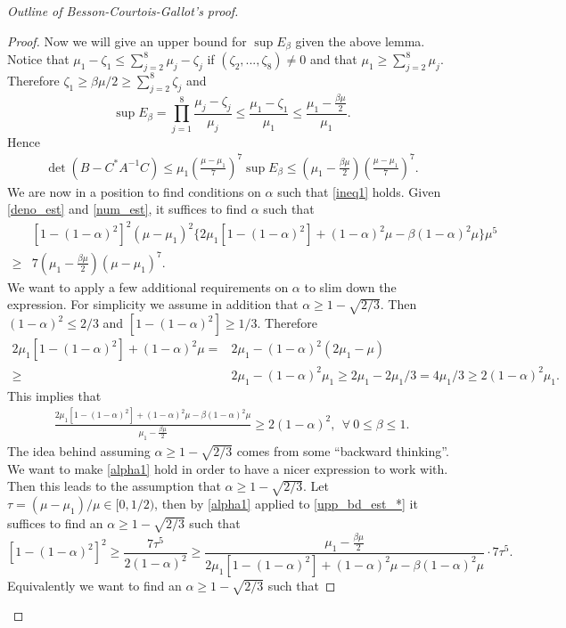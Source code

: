 \documentclass{article}
\theoremstyle{definition}
\begin{document}
\begin{proof}[Outline of Besson-Courtois-Gallot's proof]
\begin{proof}
Now we will give an upper bound for $\sup E_\beta$ given the above lemma. Notice that $\mu_1-\zeta_1\leq\sum_{j=2}^8\mu_j-\zeta_j$ if $(\zeta_2,...,\zeta_8)\neq 0$ and that $\mu_1\geq\sum_{j=2}^8\mu_j$. Therefore $\zeta_1\geq\beta\mu/2\geq\sum_{j=2}^8\zeta_j$ and
$$\sup E_\beta=\prod_{j=1}^8\frac{\mu_j-\zeta_j}{\mu_j}\leq\frac{\mu_1-\zeta_1}{\mu_1}\leq\frac{\mu_1-\frac{\beta\mu}{2}}{\mu_1}.$$
Hence
\begin{align}\label{num_est}
\det(B-C^*A^{-1}C)\leq \mu_1\left(\frac{\mu-\mu_1}{7}\right)^7\sup E_\beta\leq\left(\mu_1-\frac{\beta\mu}{2}\right)\left(\frac{\mu-\mu_1}{7}\right)^7.
\end{align}
We are now in a position to find conditions on $\alpha$ such that \eqref{ineq1} holds. Given \eqref{deno_est} and \eqref{num_est}, it suffices to find $\alpha$ such that
\begin{align}\label{upp_bd_est_*}
&[1-(1-\alpha)^2]^2(\mu-\mu_1)^2\{2\mu_1[1-(1-\alpha)^2]+(1-\alpha)^2\mu-\beta(1-\alpha)^2\mu\}\mu^5\nonumber \\
\geq&7\left(\mu_1-\frac{\beta\mu}{2}\right)(\mu-\mu_1)^7.
\end{align}
We want to apply a few additional requirements on $\alpha$ to slim down the expression. For simplicity we assume in addition that $\alpha\geq1-\sqrt{2/3}$. Then $(1-\alpha)^2\leq 2/3$ and $[1-(1-\alpha)^2]\geq 1/3$. Therefore
\begin{align*}
2\mu_1[1-(1-\alpha)^2]+(1-\alpha)^2\mu=&2\mu_1-(1-\alpha)^2(2\mu_1-\mu) \\
\geq&2\mu_1-(1-\alpha)^2\mu_1\geq2\mu_1-2\mu_1/3=4\mu_1/3\geq 2(1-\alpha)^2\mu_1.
\end{align*}
This implies that
\begin{align}\label{alpha1}
\frac{2\mu_1[1-(1-\alpha)^2]+(1-\alpha)^2\mu-\beta(1-\alpha)^2\mu}{\mu_1-\frac{\beta\mu}{2}}\geq 2(1-\alpha)^2,~~\forall~0\leq\beta\leq 1.
\end{align}
The idea behind assuming $\alpha\geq1-\sqrt{2/3}$ comes from some ``backward thinking''. We want to make \eqref{alpha1} hold in order to have a nicer expression to work with. Then this leads to the assumption that $\alpha\geq1-\sqrt{2/3}$. Let $\tau=(\mu-\mu_1)/\mu\in[0,1/2)$, then by \eqref{alpha1} applied to \eqref{upp_bd_est_*} it suffices to find an $\alpha\geq1-\sqrt{2/3}$ such that
$$[1-(1-\alpha)^2]^2\geq \frac{7\tau^5}{2(1-\alpha)^2}\geq\frac{\mu_1-\frac{\beta\mu}{2}}{2\mu_1[1-(1-\alpha)^2]+(1-\alpha)^2\mu-\beta(1-\alpha)^2\mu}\cdot 7\tau^5.$$
Equivalently we want to find an $\alpha\geq1-\sqrt{2/3}$ such that

\end{proof}
\end{proof}
\end{document}
